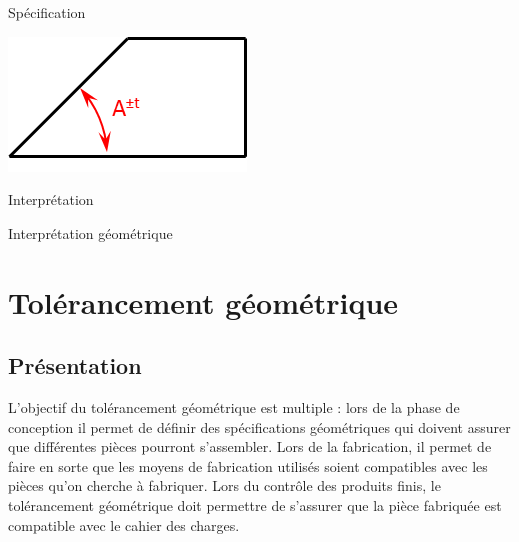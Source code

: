 \documentclass[11pt,oneside]{article}
\begin{document}
\begin{exemple}
\textit{}

\begin{minipage}[t]{.3\linewidth}
\begin{center}
Spécification

\includegraphics[width=.95\textwidth]{png/ang}
\end{center}
\end{minipage} \hfill
\begin{minipage}[t]{.3\linewidth}
\begin{center}
Interprétation
\end{center}
\end{minipage} \hfill
\begin{minipage}[t]{.3\linewidth}
\begin{center}
Interprétation géométrique

\end{center}
\end{minipage}
\end{exemple}


\section{Tolérancement géométrique}

\subsection{Présentation}

L'objectif du tolérancement géométrique est multiple : lors de la phase de conception il permet de définir des spécifications géométriques qui doivent assurer que différentes pièces pourront s'assembler. Lors de la fabrication, il permet de faire en sorte que les moyens de fabrication utilisés soient compatibles avec les pièces qu'on cherche à fabriquer. Lors du contrôle des produits finis, le tolérancement géométrique doit permettre de s'assurer que la pièce fabriquée est compatible avec le cahier des charges. 
\end{document}
